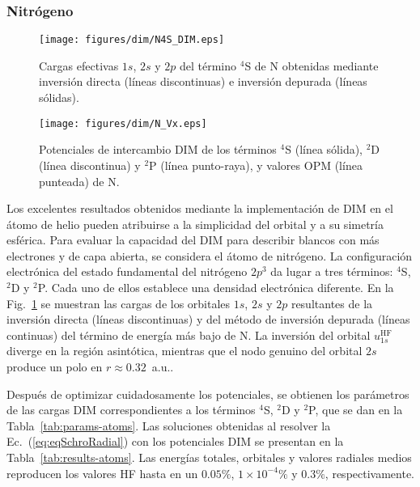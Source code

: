 \subsubsection{Nitrógeno}

\begin{figure}[t]
\centering
\texttt{[image: figures/dim/N4S\_DIM.eps]}
\caption[Cargas efectivas DIM de N.]
{Cargas efectivas $1s$, $2s$ y $2p$ del término $^4$S de N obtenidas 
mediante inversión directa (líneas discontinuas) e inversión depurada 
(líneas sólidas).}
\label{fig:Nzeff}
\end{figure}

\begin{figure}[t]
\centering
\texttt{[image: figures/dim/N\_Vx.eps]}
\caption[Potenciales de intercambio DIM de N.]
{Potenciales de intercambio DIM de los términos $^4$S (línea sólida), 
$^2$D (línea discontinua) y $^2$P (línea punto-raya), y valores OPM 
(línea punteada) de N.}
\label{fig:NVx}
\end{figure}

Los excelentes resultados obtenidos mediante la implementación de DIM en 
el átomo de helio pueden atribuirse a la simplicidad del orbital y a 
su simetría esférica. Para evaluar la capacidad del DIM para describir 
blancos con más electrones y de capa abierta, se considera el átomo de 
nitrógeno. La configuración electrónica del estado fundamental del 
nitrógeno $2p^3$ da lugar a tres términos: $^4$S, $^2$D y $^2$P. Cada 
uno de ellos establece una densidad electrónica diferente. En la 
Fig.~\ref{fig:Nzeff} se muestran las cargas de los orbitales $1s$, $2s$ 
y $2p$ resultantes de la inversión directa (líneas discontinuas) y del 
método de inversión depurada (líneas continuas) del término de energía 
más bajo de N. La inversión del orbital $u_{1s}^{\mathrm{HF}}$ diverge 
en la región asintótica, mientras que el nodo genuino del orbital $2s$
produce un polo en $r\approx 0.32$~a.u..

Después de optimizar cuidadosamente los potenciales, se obtienen los 
parámetros de las cargas DIM correspondientes a los términos $^4$S, 
$^2$D y $^2$P, que se dan en la Tabla~\ref{tab:params-atoms}. Las 
soluciones obtenidas al resolver la Ec.~(\ref{eq:eqSchroRadial}) con los 
potenciales DIM se presentan en la Tabla~\ref{tab:results-atoms}. Las 
energías totales, orbitales y valores radiales medios reproducen los 
valores HF hasta en un $0.05\%$, $1\times 10^{-4}\%$ y $0.3\%$, 
respectivamente. 

